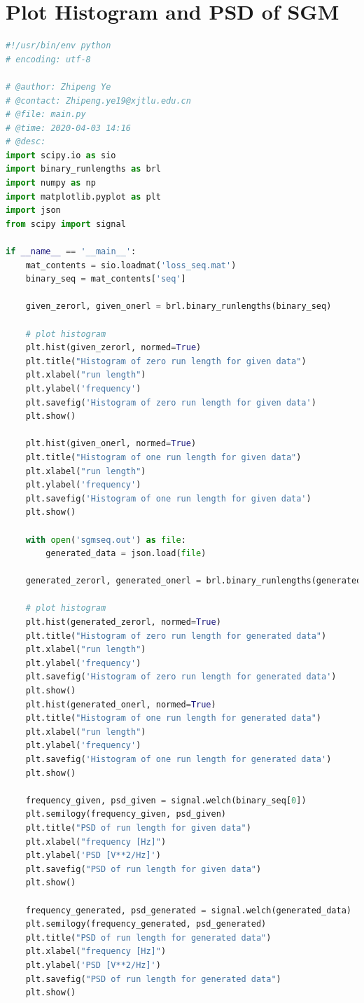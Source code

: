 \documentclass[11pt]{article}
\begin{document}
\section{Plot Histogram and PSD of SGM} \label{PLTSGM}
\begin{lstlisting}[language=Python]
#!/usr/bin/env python
# encoding: utf-8

# @author: Zhipeng Ye
# @contact: Zhipeng.ye19@xjtlu.edu.cn
# @file: main.py
# @time: 2020-04-03 14:16
# @desc:
import scipy.io as sio
import binary_runlengths as brl
import numpy as np
import matplotlib.pyplot as plt
import json
from scipy import signal

if __name__ == '__main__':
    mat_contents = sio.loadmat('loss_seq.mat')
    binary_seq = mat_contents['seq']

    given_zerorl, given_onerl = brl.binary_runlengths(binary_seq)

    # plot histogram
    plt.hist(given_zerorl, normed=True)
    plt.title("Histogram of zero run length for given data")
    plt.xlabel("run length")
    plt.ylabel('frequency')
    plt.savefig('Histogram of zero run length for given data')
    plt.show()

    plt.hist(given_onerl, normed=True)
    plt.title("Histogram of one run length for given data")
    plt.xlabel("run length")
    plt.ylabel('frequency')
    plt.savefig('Histogram of one run length for given data')
    plt.show()

    with open('sgmseq.out') as file:
        generated_data = json.load(file)

    generated_zerorl, generated_onerl = brl.binary_runlengths(generated_data)

    # plot histogram
    plt.hist(generated_zerorl, normed=True)
    plt.title("Histogram of zero run length for generated data")
    plt.xlabel("run length")
    plt.ylabel('frequency')
    plt.savefig('Histogram of zero run length for generated data')
    plt.show()
    plt.hist(generated_onerl, normed=True)
    plt.title("Histogram of one run length for generated data")
    plt.xlabel("run length")
    plt.ylabel('frequency')
    plt.savefig('Histogram of one run length for generated data')
    plt.show()

    frequency_given, psd_given = signal.welch(binary_seq[0])
    plt.semilogy(frequency_given, psd_given)
    plt.title("PSD of run length for given data")
    plt.xlabel("frequency [Hz]")
    plt.ylabel('PSD [V**2/Hz]')
    plt.savefig("PSD of run length for given data")
    plt.show()

    frequency_generated, psd_generated = signal.welch(generated_data)
    plt.semilogy(frequency_generated, psd_generated)
    plt.title("PSD of run length for generated data")
    plt.xlabel("frequency [Hz]")
    plt.ylabel('PSD [V**2/Hz]')
    plt.savefig("PSD of run length for generated data")
    plt.show()

\end{lstlisting}
\end{document}
